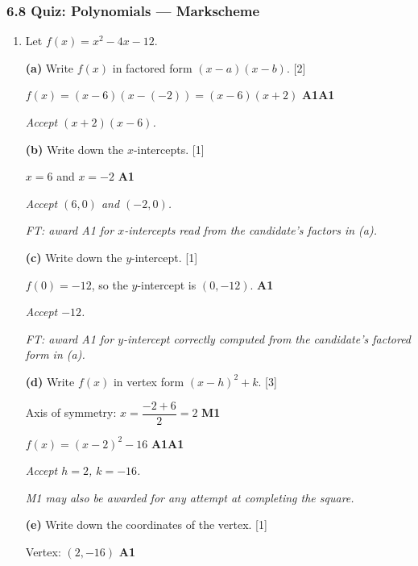 \documentclass[12pt, twoside]{article}
\begin{document}
\subsubsection*{6.8 Quiz: Polynomials --- Markscheme}

\begin{enumerate}[itemsep=0.3cm]

\item[1.] [Maximum mark: 8]

Let $f(x) = x^2 - 4x - 12$.

\medskip

\textbf{(a)} Write $f(x)$ in factored form $(x - a)(x - b)$. \hfill [2]

$f(x) = (x - 6)(x - (-2)) = (x - 6)(x + 2)$ \hfill \textbf{A1A1}

\emph{Accept $(x + 2)(x - 6)$.}

\medskip

\textbf{(b)} Write down the $x$-intercepts. \hfill [1]

$x = 6$ and $x = -2$ \hfill \textbf{A1}

\emph{Accept $(6, 0)$ and $(-2, 0)$.}

\emph{FT: award A1 for $x$-intercepts read from the candidate's factors in (a).}

\medskip

\textbf{(c)} Write down the $y$-intercept. \hfill [1]

$f(0) = -12$, so the $y$-intercept is $(0, -12)$. \hfill \textbf{A1}

\emph{Accept $-12$.}

\emph{FT: award A1 for $y$-intercept correctly computed from the candidate's factored form in (a).}

\medskip

\textbf{(d)} Write $f(x)$ in vertex form $(x - h)^2 + k$. \hfill [3]

Axis of symmetry: $x = \dfrac{-2 + 6}{2} = 2$ \hfill \textbf{M1}

$f(x) = (x - 2)^2 - 16$ \hfill \textbf{A1A1}

\emph{Accept $h = 2$, $k = -16$.}

\emph{M1 may also be awarded for any attempt at completing the square.}

\medskip

\textbf{(e)} Write down the coordinates of the vertex. \hfill [1]

Vertex: $(2, -16)$ \hfill \textbf{A1}


\end{enumerate}
\end{document}
